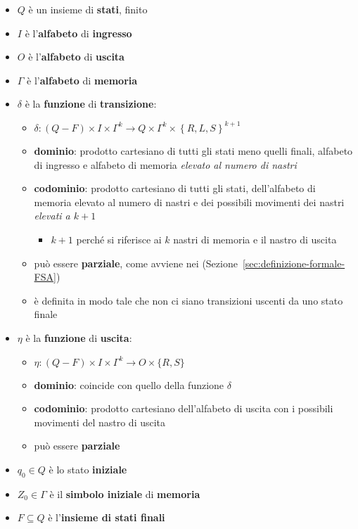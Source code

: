 \documentclass[italian, 10pt]{article}
\begin{document}
\begin{itemize}
  \item \(Q\) è un insieme di \textbf{stati}, finito
  \item \(I\) è l'\textbf{alfabeto} di \textbf{ingresso}
  \item \(O\) è l'\textbf{alfabeto} di \textbf{uscita}
  \item \(\Gamma\) è l'\textbf{alfabeto} di \textbf{memoria}
  \item \(\delta\) è la \textbf{funzione} di \textbf{transizione}:
        \begin{itemize}
          \item  \(\delta: \left(Q-F\right) \times I \times \Gamma^k \rightarrow Q \times \Gamma^k \times \left\{R, L, S \right\}^{k+1}\)
          \item \textbf{dominio}: prodotto cartesiano di tutti gli stati meno quelli finali, alfabeto di ingresso e alfabeto di memoria \textit{elevato al numero di nastri}
          \item \textbf{codominio}: prodotto cartesiano di tutti gli stati, dell'alfabeto di memoria elevato al numero di nastri e dei possibili movimenti dei nastri \textit{elevati a \(k+1\)}
                \begin{itemize}[label=\(\rightarrow\)]
                  \item \(k+1\) perché si riferisce ai \(k\) nastri di memoria e il nastro di uscita
                \end{itemize}
          \item può essere \textbf{parziale}, come avviene nei \FSA (Sezione~\ref{sec:definizione-formale-FSA})
          \item è definita in modo tale che non ci siano transizioni uscenti da uno stato finale
        \end{itemize}
  \item \(\eta\) è la \textbf{funzione} di \textbf{uscita}:
        \begin{itemize}
          \item \(\eta : (Q - F) \times I \times \Gamma^k \rightarrow O \times \{R, S\}\)
          \item \textbf{dominio}: coincide con quello della funzione \(\delta\)
          \item \textbf{codominio}: prodotto cartesiano dell'alfabeto di uscita con i possibili movimenti del nastro di uscita
          \item può essere \textbf{parziale}
        \end{itemize}
  \item \(q_0 \in Q\) è lo stato \textbf{iniziale}
  \item \(Z_0 \in \Gamma\) è il \textbf{simbolo iniziale} di \textbf{memoria}
  \item \(F \subseteq Q\) è l'\textbf{insieme di stati finali}
\end{itemize}
\end{document}

